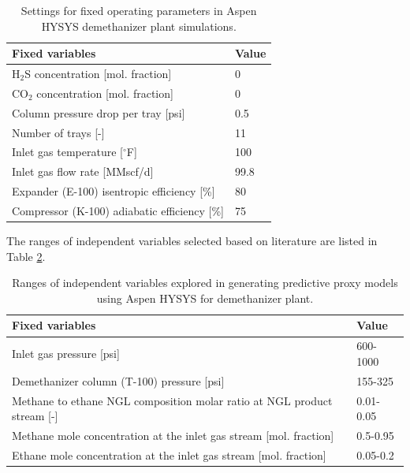 \documentclass[11pt]{report}
\begin{document}
\begin{table}
\begin{scriptsize}
\caption{Settings for fixed operating parameters in Aspen HYSYS demethanizer plant simulations.}
\label{tab:demethanizer_aspen1}
\begin{tabular*}{1\columnwidth}{p{}p{}}
\toprule
Fixed variables & Value\\
\midrule
H$_2$S concentration {[}mol. fraction{]} & 0   \\
CO$_2$ concentration {[}mol. fraction{]}                                             & 0       \\
Column pressure drop per tray {[}psi{]}                                 & 0.5    \\
Number of trays {[}-{]}                                                           & 11   \\
Inlet gas temperature {[}$^\circ$F{]}                                                    & 100  \\
Inlet gas flow rate {[}MMscf/d{]}                                                 & 99.8    \\
Expander (E-100) isentropic efficiency {[}\%{]}                                   & 80    \\
Compressor (K-100) adiabatic efficiency {[}\%{]}                                  & 75   \\
\bottomrule
\end{tabular*}
\end{scriptsize}
\end{table}

The ranges of independent variables selected based on literature \cite{Manning1991, luyben2013ngl, nawaz2010synthesis} are listed in Table \ref{tab:demethanizer_aspen2}.

\begin{table}
\begin{scriptsize}
\caption{Ranges of independent variables explored in generating predictive proxy models using Aspen HYSYS for demethanizer plant.}
\label{tab:demethanizer_aspen2}
\begin{tabular*}{1\columnwidth}{p{}p{}}
\toprule
Fixed variables & Value\\
\midrule
Inlet gas pressure {[}psi{]} & 600-1000   \\
Demethanizer column (T-100) pressure {[}psi{]}                                             & 155-325      \\
Methane to ethane NGL composition molar ratio at NGL product stream {[}-{]}                                 & 0.01-0.05    \\
Methane mole concentration at the inlet gas stream {[}mol. fraction{]}                                                           & 0.5-0.95   \\
Ethane mole concentration at the inlet gas stream {[}mol. fraction{]}                                                    & 0.05-0.2  \\
\bottomrule
\end{tabular*}
\end{scriptsize}
\end{table}
\end{document}
